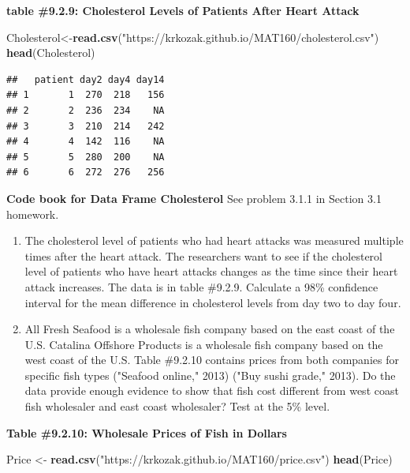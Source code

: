 \documentclass[]{book}
\newenvironment{Shaded}{\begin{snugshade}}{\end{snugshade}}
\newcommand{\KeywordTok}[1]{\textcolor[rgb]{0.13,0.29,0.53}{\textbf{#1}}}
\newcommand{\NormalTok}[1]{#1}
\newcommand{\StringTok}[1]{\textcolor[rgb]{0.31,0.60,0.02}{#1}}
\begin{document}
\textbf{table \#9.2.9: Cholesterol Levels of Patients After Heart Attack}

\begin{Shaded}
\begin{Highlighting}[]
\NormalTok{Cholesterol<-}\KeywordTok{read.csv}\NormalTok{(}\StringTok{"https://krkozak.github.io/MAT160/cholesterol.csv"}\NormalTok{)}
\KeywordTok{head}\NormalTok{(Cholesterol)}
\end{Highlighting}
\end{Shaded}

\begin{verbatim}
##   patient day2 day4 day14
## 1       1  270  218   156
## 2       2  236  234    NA
## 3       3  210  214   242
## 4       4  142  116    NA
## 5       5  280  200    NA
## 6       6  272  276   256
\end{verbatim}

\textbf{Code book for Data Frame Cholesterol} See problem 3.1.1 in Section 3.1 homework.

\begin{enumerate}
\def\labelenumi{\arabic{enumi}.}
\setcounter{enumi}{1}
\item
  The cholesterol level of patients who had heart attacks was measured multiple times after the heart attack. The researchers want to see if the cholesterol level of patients who have heart attacks changes as the time since their heart attack increases. The data is in table \#9.2.9. Calculate a 98\% confidence interval for the mean difference in cholesterol levels from day two to day four.
\item
  All Fresh Seafood is a wholesale fish company based on the east coast of the U.S. Catalina Offshore Products is a wholesale fish company based on the west coast of the U.S. Table \#9.2.10 contains prices from both companies for specific fish types ("Seafood online," 2013) ("Buy sushi grade," 2013). Do the data provide enough evidence to show that fish cost different from west coast fish wholesaler and east coast wholesaler? Test at the 5\% level.
\end{enumerate}

\textbf{Table \#9.2.10: Wholesale Prices of Fish in Dollars}

\begin{Shaded}
\begin{Highlighting}[]
\NormalTok{ Price <-}\StringTok{ }\KeywordTok{read.csv}\NormalTok{(}\StringTok{"https://krkozak.github.io/MAT160/price.csv"}\NormalTok{)}
\KeywordTok{head}\NormalTok{(Price)}
\end{Highlighting}
\end{Shaded}
\end{document}
